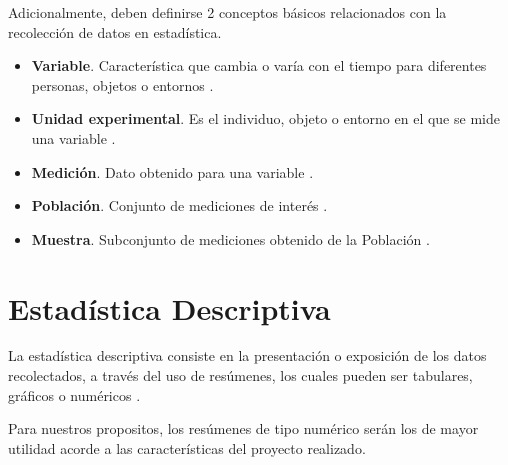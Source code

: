 \clearpage

Adicionalmente, deben definirse 2 conceptos básicos relacionados con la recolección de datos en estadística.

\begin{itemize}
    \item \textbf{Variable}. Característica que cambia o varía con el tiempo para diferentes personas, objetos o entornos \cite{mendenhall}.
    \item \textbf{Unidad experimental}. Es el individuo, objeto o entorno en el que se mide una variable \cite{mendenhall}. 
    \item \textbf{Medición}. Dato obtenido para una variable \cite{mendenhall}.
    \item \textbf{Población}. Conjunto de mediciones de interés \cite{mendenhall}.
    \item \textbf{Muestra}. Subconjunto de mediciones obtenido de la Población \cite{mendenhall}.
\end{itemize}

\section{Estadística Descriptiva}

La estadística descriptiva consiste en la presentación o exposición de los datos recolectados, a través del uso de resúmenes, los cuales pueden ser tabulares, gráficos o numéricos \cite{anderson}.

Para nuestros propositos, los resúmenes de tipo numérico serán los de mayor utilidad acorde a las características del proyecto realizado.


